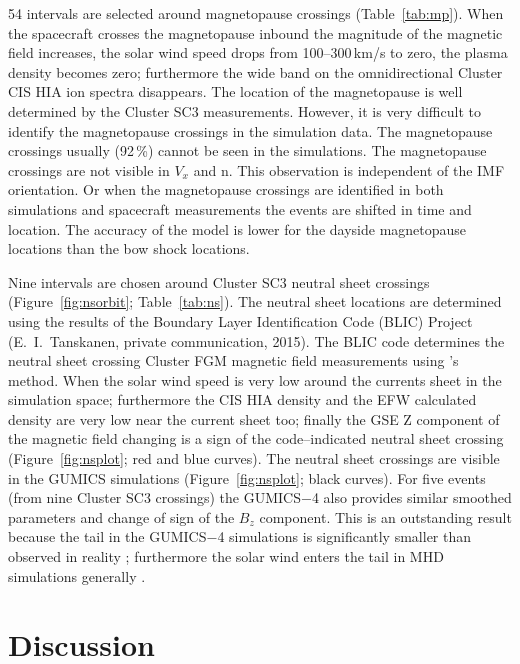 \documentclass[draft]{agujournal2019}
\begin{document}
54 intervals are selected around magnetopause crossings (Table~\ref{tab:mp}). When the spacecraft crosses the magnetopause inbound the magnitude of the magnetic field increases, the solar wind speed drops from 100--300\,km/s to zero, the plasma density becomes zero; furthermore the wide band on the omnidirectional Cluster CIS HIA ion spectra disappears. The location of the magnetopause is well determined by the Cluster SC3 measurements. However, it is very difficult to identify the magnetopause crossings in the simulation data. The magnetopause crossings usually (92\,\%) cannot be seen in the simulations. The magnetopause crossings are not visible in $V_{x}$ and n. This observation is independent of the IMF orientation. Or when the magnetopause crossings are identified in both simulations and spacecraft measurements the events are shifted in time and location. The accuracy of the model is lower for the dayside magnetopause locations than the bow shock locations. 

Nine intervals are chosen around Cluster SC3 neutral sheet crossings (Figure~\ref{fig:nsorbit}; Table~\ref{tab:ns}). The neutral sheet locations are determined using the results of the Boundary Layer Identification Code (BLIC) Project (E.~I.~Tanskanen, private communication, 2015). The BLIC code determines the neutral sheet crossing Cluster FGM magnetic field measurements using 's method. When the solar wind speed is very low around the currents sheet in the simulation space; furthermore the CIS HIA density and the EFW calculated density are very low near the current sheet too; finally the GSE Z component of the magnetic field changing is a sign of the code--indicated neutral sheet crossing (Figure~\ref{fig:nsplot}; red and blue curves). The neutral sheet crossings are visible in the GUMICS simulations (Figure~\ref{fig:nsplot}; black curves). For five events (from nine Cluster SC3 crossings) the GUMICS$-$4 also provides similar smoothed parameters and change of sign of the $B_{z}$ component. This is an outstanding result because the tail in the GUMICS$-$4 simulations is significantly smaller than observed in reality \cite{gordeev13:_verif_gumic_mhd,facsko16:_one_earth}; furthermore the solar wind enters the tail in MHD simulations generally \cite{kallio15:_proper}.

\section{Discussion}
\label{sec:discussion}
\end{document}
